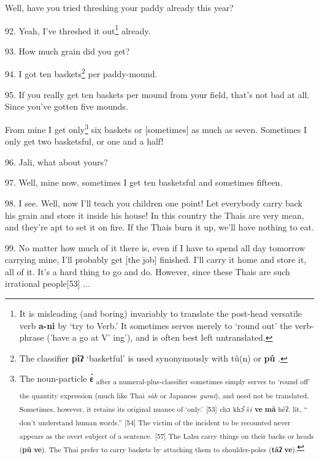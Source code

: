 Well, have you tried threshing your paddy already this year?

92. Yeah, I've threshed it out\footnote{It is misleading (and boring) invariably to translate the post-head versatile verb \textbf{a-ni} by `try to Verb.' It sometimes serves merely to `round out' the verb-phrase ('have a go at V' ing'), and is often best left untranslated.} already.

93. How much grain did you get?

94. I got ten baskets\footnote{The classifier \textbf{pîʔ} `basketful' is used synonymously with tû(n) or \textbf{pû} .} per paddy-mound.

95. If you really get ten baskets per mound from your field, that's not bad at
all. Since you've gotten five mounds.

From mine I get only\footnote{The noun-particle \textbf{ɛ̀} \textsubscript{after a numeral-plus-classifier sometimes simply serves to `round off' the quantity expression (much like Thai }\textsubscript{\textit{sàk }}\textsubscript{or Japanese }\textsubscript{\textit{gurai}}\textsubscript{), and need not be translated. Sometimes, however, it retains its original nuance of `only.'} \textsubscript{[53] }\textsubscript{ch}\textsubscript{ɔ}\textsubscript{ kh}\textsubscript{ɔ̂}\textsubscript{ š}\textsubscript{\textit{\emph{i}}}\textsubscript{ \textbf{ve} \textbf{mâ} hê}\textsubscript{ʔ. lit, `` don't understand human words.''} \textsubscript{[54] The victim of the incident to be recounted never appears as the overt subject of a sentence. } \textsubscript{[57] The Lahu carry things on their backs or heads (\textbf{pû} \textbf{ve}). The Thai prefer to carry baskets by attaching them to shoulder-poles (\textbf{tâʔ} \textbf{ve}).}} six baskets or [sometimes] as much as seven. Sometimes
I only get two basketsful, or one and a half!

96. Jali, what about yours?

97. Well, mine now, sometimes I get ten basketsful and sometimes fifteen.

98. I see. Well, now I'll teach you children one point! Let everybody carry back
his grain and store it inside his house! In this country the Thais are very mean,
and they're apt to set it on fire. If the Thais burn it up, we'll have nothing
to eat.

99. No matter how much of it there is, even if I have to spend all day tomorrow
carrying mine, I'll probably get [the job] finished. I'll carry it home and store
it, all of it. It's a hard thing to go and do. However, since these Thais are
such irrational people[53] ...

